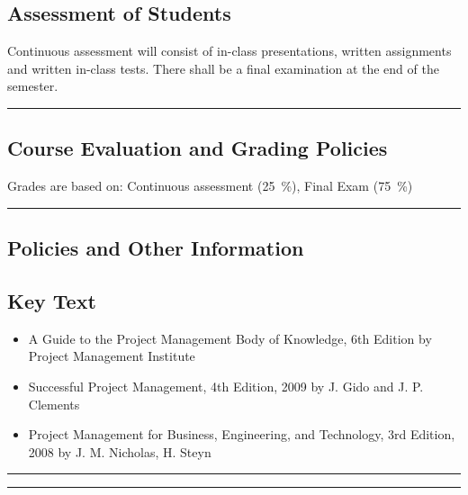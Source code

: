 \subsection*{Assessment of Students}
\begin{outline}
    \1 Continuous assessment will consist of in-class presentations, written assignments and written in-class tests.
    \1 There shall be a final examination at the end of the semester.
\end{outline}
\vspace{2ex}\hrule\vspace{2ex}

\subsection*{Course Evaluation and Grading Policies}
Grades are based on:
Continuous assessment (\qty{25}{\percent}),
Final Exam (\qty{75}{\percent})
\vspace{2ex}\hrule\vspace{2ex}



\subsection*{Policies and Other Information}
\subsection*{Key Text}
\begin{itemize}
    \item A Guide to the Project Management Body of Knowledge, 6th Edition by Project Management Institute
    \item  Successful Project Management, 4th Edition, 2009 by J. Gido and J. P. Clements
    \item Project Management for Business, Engineering, and  Technology, 3rd Edition, 2008 by J. M. Nicholas, H. Steyn
\end{itemize}
\vspace{2ex}\hrule
\vspace{2ex}\hrule\vspace{2ex}